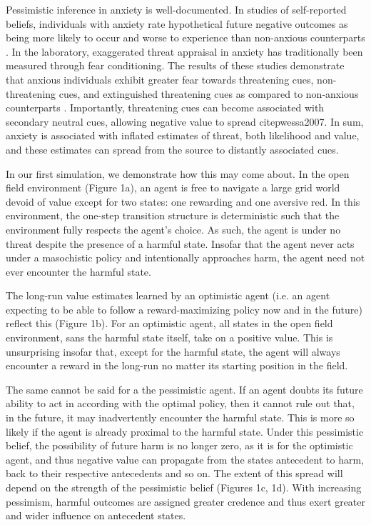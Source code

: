 \documentclass[11pt]{article} %
\begin{document}
Pessimistic inference in anxiety is well-documented. In studies of self-reported beliefs,
individuals with anxiety rate
hypothetical future negative outcomes as being more likely to occur and worse to
experience than non-anxious counterparts \citep{ButlerMathews1983, ButlerMathews1987,
Foa1996, MacLeod1996, MacLeod1997, Luten1997, Stober1997, Borkovec1999, Maner2006,
Mitte2007, Miranda2007}. In the laboratory, exaggerated threat appraisal in anxiety
has traditionally been measured through fear conditioning. The results of these
studies demonstrate that anxious individuals exhibit greater fear towards threatening
cues, non-threatening cues, and extinguished threatening cues as compared to non-anxious
counterparts \citep{lissek2005, MinekaOehlberg2008, Duits2015}. Importantly, threatening
cues can become associated with secondary neutral cues, allowing negative value to
spread citep{wessa2007}. In sum, anxiety is associated with inflated estimates of
threat, both likelihood and value, and these estimates can spread from the source
to distantly associated cues.

In our first simulation, we demonstrate how this may come about. In the open field
environment (Figure 1a), an agent is free to navigate a large grid world devoid
of value except for two states: one rewarding and one aversive red. In this environment,
the one-step transition structure is deterministic such that the environment
fully respects the agent's choice. As such, the agent is under no threat despite
the presence of a harmful state. Insofar that the agent never acts under a
masochistic policy and intentionally approaches harm, the agent need not ever
encounter the harmful state.

The long-run value estimates learned by an optimistic agent (i.e. an agent expecting
to be able to follow a reward-maximizing policy now and in the future) reflect this
(Figure 1b). For an optimistic agent, all states in the open field environment,
sans the harmful state itself, take on a positive value. This is unsurprising
insofar that, except for the harmful state, the agent will always encounter
a reward in the long-run no matter its starting position in the field.

The same cannot be said for a the pessimistic agent. If an agent doubts its future
ability to act in according with the optimal policy, then it cannot rule out that,
in the future, it may inadvertently encounter the harmful state. This is more so
likely if the agent is already proximal to the harmful state. Under this pessimistic
belief, the possibility of future harm is no longer zero, as it is for the optimistic
agent, and thus negative value can propagate from the states antecedent to harm,
back to their respective antecedents and so on. The extent of this spread will depend
on the strength of the pessimistic belief (Figures 1c, 1d). With increasing pessimism,
harmful outcomes are assigned greater credence and thus exert greater and wider
influence on antecedent states.
\end{document}
